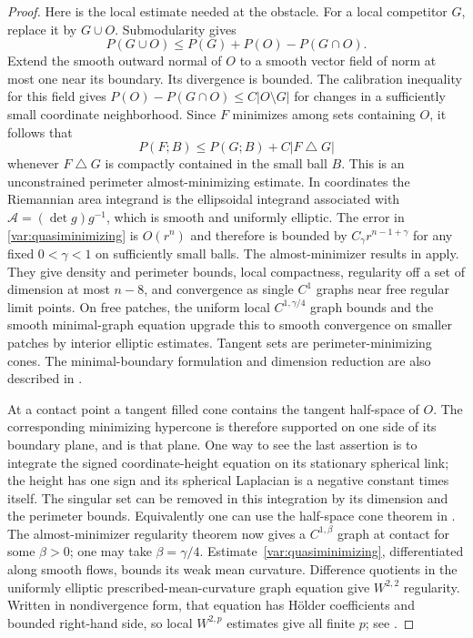 \begin{proof}
Here is the local estimate needed at the obstacle.  For a local
competitor $G$, replace it by $G\cup O$.  Submodularity gives
\begin{equation}
 P(G\cup O)\le P(G)+P(O)-P(G\cap O).
 \label{var:obstacle-submodularity}
\end{equation}
Extend the smooth outward normal of $O$ to a smooth vector field of
norm at most one near its boundary.  Its divergence is bounded.
The calibration inequality for this field gives
$P(O)-P(G\cap O)\le C|O\setminus G|$ for changes in a sufficiently
small coordinate neighborhood.  Since $F$ minimizes among sets
containing $O$, it follows that
\begin{equation}
 P(F;B)\le P(G;B)+C|F\mathbin{\triangle}G|
 \label{var:quasiminimizing}
\end{equation}
whenever $F\mathbin{\triangle}G$ is compactly contained in the small
ball $B$.  This is an unconstrained perimeter almost-minimizing
estimate.  In coordinates the Riemannian area integrand is the
ellipsoidal integrand associated with
$\mathcal A=(\det g)g^{-1}$, which is smooth and uniformly elliptic.
The error in \eqref{var:quasiminimizing} is $O(r^n)$ and therefore is
bounded by $C_\gamma r^{n-1+\gamma}$ for any fixed
$0<\gamma<1$ on sufficiently small balls.  The almost-minimizer results in
\cite[Propositions~4.5--4.7 and Theorems~1.1, 9.5,
10.2--10.3]{Simmons2022} apply.  They give density and perimeter
bounds, local compactness, regularity off a set of dimension at
most $n-8$, and convergence as single $C^1$ graphs near free
regular limit points.  On free patches, the uniform local
$C^{1,\gamma/4}$ graph bounds and the smooth minimal-graph
equation upgrade this to smooth convergence on smaller patches
by interior elliptic estimates.  Tangent sets are
perimeter-minimizing cones.  The minimal-boundary formulation and
dimension reduction are also described in
\cite[Chapter 7, Section 5]{SimonGMT2014}.

At a contact point a tangent filled cone contains the tangent
half-space of $O$.  The corresponding minimizing hypercone is
therefore supported on one side of its boundary plane, and is that
plane.  One way to see the last assertion is to integrate the signed
coordinate-height equation on its stationary spherical link; the
height has one sign and its spherical Laplacian is a negative
constant times itself.  The singular set can be removed in this
integration by its dimension and the perimeter bounds.  Equivalently
one can use the half-space cone theorem in
\cite[Chapter~7, Section~4, Theorem~4.5]{SimonGMT2014}.  The almost-minimizer
regularity theorem now gives a $C^{1,\beta}$ graph at contact
for some $\beta>0$; one may take $\beta=\gamma/4$.
Estimate~\eqref{var:quasiminimizing}, differentiated along smooth
flows, bounds its weak mean curvature.  Difference quotients in the
uniformly elliptic prescribed-mean-curvature graph equation give
$W^{2,2}$ regularity.  Written in nondivergence form, that equation
has H\"older coefficients and bounded right-hand side, so local
$W^{2,p}$ estimates give all finite $p$; see
\cite{GilbargTrudinger2001}.


\end{proof}
